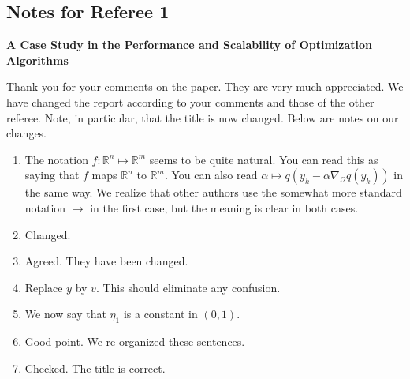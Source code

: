 \documentclass[11pt]{article}
\newcommand{\R}{\mbox{${\mathbb R}$}}
\begin{document}
\setlength{\baselineskip}{15pt}

\pagestyle {plain}

\subsection*{Notes for Referee 1}


\begin{center}
\textbf{A Case Study in the Performance and Scalability of
Optimization Algorithms}
\end{center}

Thank you for your comments on the paper. They are very much
appreciated.
We have changed the report according to your comments and those
of the other referee. Note, in particular, that the title is now changed.
Below are notes on our changes. 

\begin{enumerate}
\item
The notation $ f : \R^n \mapsto \R^m $ seems to be quite natural.
You can read this as saying that $f$ maps $ \R^n $ to $ \R^m $.
You can also read 
$ \alpha \mapsto 
q \left (y_k - \alpha  \nabla_{\Omega} q(y_k) \right ) $ 
in the same way.
We realize that other authors use the somewhat more standard
notation $ \to $ in the first case, but the meaning is clear in both cases.
\item
Changed.
\item
Agreed. They have been changed.
\item
Replace $y$ by $v$. This should eliminate any confusion.
\item
We now say that $ \eta_1 $ is a constant in $ (0,1) $.
\item
Good point. We re-organized these sentences.
\item
Checked. The title is correct.
\end{enumerate}
\end{document}
